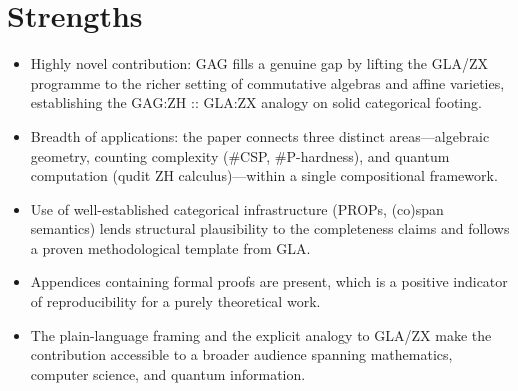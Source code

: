 \documentclass[11pt]{article}
\begin{document}
\section*{Strengths}
\begin{itemize}[leftmargin=*]
  \item Highly novel contribution: GAG fills a genuine gap by lifting the GLA/ZX programme to the richer setting of commutative algebras and affine varieties, establishing the GAG:ZH :: GLA:ZX analogy on solid categorical footing.
  \item Breadth of applications: the paper connects three distinct areas—algebraic geometry, counting complexity (\#CSP, \#P-hardness), and quantum computation (qudit ZH calculus)—within a single compositional framework.
  \item Use of well-established categorical infrastructure (PROPs, (co)span semantics) lends structural plausibility to the completeness claims and follows a proven methodological template from GLA.
  \item Appendices containing formal proofs are present, which is a positive indicator of reproducibility for a purely theoretical work.
  \item The plain-language framing and the explicit analogy to GLA/ZX make the contribution accessible to a broader audience spanning mathematics, computer science, and quantum information.
\end{itemize}
\end{document}
